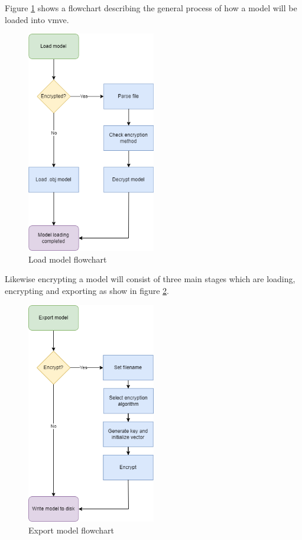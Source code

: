 \documentclass[11pt]{article}
\begin{document}
Figure \ref{fig:load_model_flowchart} shows a flowchart describing the general
process of how a model will be loaded into \gls*{vmve}.

\begin{figure}[H]
  \centering
  \includegraphics[width=0.5\textwidth]{images/load_model_flowchart.png}
  \caption{Load model flowchart}
  \label{fig:load_model_flowchart}
\end{figure}

Likewise encrypting a model will consist of three main stages which are loading, encrypting
and exporting as show in figure \ref{fig:export_model_flowchart}.
\begin{figure}[H]
  \centering
  \includegraphics[width=0.5\textwidth]{images/export_model_flowchart.png}
  \caption{Export model flowchart}
  \label{fig:export_model_flowchart}
\end{figure}
\end{document}
